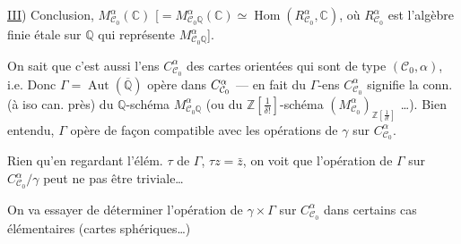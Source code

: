 \uline{III}) Conclusion,  $M^{\alpha}_{\mathcal C_0}(\mathbb C)$ [$=M^{\alpha}_{\mathcal C_0\mathbb Q}(\mathbb C)\simeq\operatorname{Hom}(R^{\alpha}_{\mathcal C_0},\mathbb C)$, où $R^{\alpha}_{\mathcal C_0}$ est l'algèbre finie étale sur $\mathbb Q$ qui représente $M^{\alpha}_{\mathcal C_0\mathbb Q}$].

On sait que c'est aussi l'ens $C^{\alpha}_{\mathcal C_0}$ des  cartes  orientées qui sont de type $(\mathcal C_0,\alpha)$, i.e. Donc $\Gamma=\operatorname{Aut}(\overline{\mathbb Q})$ opère dans $C^{\alpha}_{\mathcal C_0}$ --- en fait   du $\Gamma$-ens  $C^{\alpha}_{\mathcal C_0}$ signifie  la conn. (à iso can. près) du $\mathbb Q$-schéma $M^{\alpha}_{\mathcal C_0\mathbb Q}$ (ou du $\mathbb Z[\frac1{\delta!}]$-schéma $(M^{\alpha}_{\mathcal C_0})_{\mathbb Z[\frac1{\delta!}]}$ \ldots). Bien entendu, $\Gamma$ opère de façon compatible  avec les opérations de $\gamma$ sur $C^{\alpha}_{\mathcal C_0}$.

Rien qu'en regardant l'élém. $\tau$ de $\Gamma$, $\tau z=\bar z$, on voit que l'opération de $\Gamma$ sur $C^{\alpha}_{\mathcal C_0}/\gamma$ peut ne pas être triviale\ldots

On va essayer de déterminer l'opération de $\gamma\times\Gamma$ sur $C^{\alpha}_{\mathcal C_0}$ dans certains cas élémentaires (cartes sphériques\ldots)
